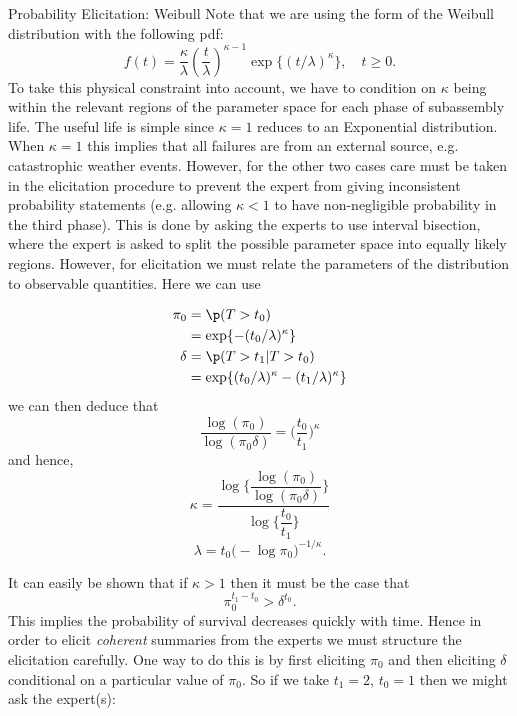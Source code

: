 \begin{chapter}{Probability Elicitation: Weibull \label{Chap:elic-weib}}
Note that we are using the form of the Weibull distribution with the following pdf:
\begin{equation}
	f(t) = \frac{\kappa}{\lambda} \left( \frac{t}{\lambda}\right)^{\kappa - 1} \exp \big\{ (t/ \lambda)^\kappa \big\}, \quad t \geq 0.
\end{equation}
To take this physical constraint into account, we have to condition on $\kappa$ being within the relevant regions of the parameter space for each phase of subassembly life. The useful life is simple since $\kappa = 1$ reduces to an Exponential distribution. When $\kappa =  1$ this implies that all failures are from an external source, e.g. catastrophic weather events. However, for the other two cases care must be taken in the elicitation procedure to prevent the expert from giving inconsistent probability statements (e.g. allowing $\kappa<1$ to have non-negligible probability in the third phase). This is done by asking the experts to use interval bisection, where the expert is asked to split the possible parameter space into equally likely regions. However, for elicitation we must relate the parameters of the distribution to observable quantities. Here we can use

\begin{align*}
	\pi_0 &= \p(T > t_0)\\
		&= \exp \{ -(t_0/ \lambda)^\kappa \}\\
	\delta &= \p(T>t_1 | T > t_0)\\
	& = \exp\{ (t_0/\lambda)^\kappa - (t_1/ \lambda)^\kappa \} 
\end{align*}
we can then deduce that
\begin{equation}
\dfrac{\log(\pi_0)}{\log(\pi_0 \delta)} = \bigg( \dfrac{t_0}{t_1}\bigg) ^\kappa \label{Eq:kappa-exponent}
\end{equation}
and hence, 
\begin{equation}
\kappa =  \dfrac{\log \bigg\{ \dfrac{\log(\pi_0)}{\log(\pi_0 \delta)} \bigg\}}{\log \bigg\{ \dfrac{t_0}{t_1}\bigg\}} \label{Eq:kappa}
\end{equation}
\begin{equation}
\lambda = t_0 \big( - \log \pi_0\big)^{-1/\kappa}. \label{Eq:lambda}
\end{equation}

It can easily be shown that if $\kappa > 1$ then it must be the case that 
\begin{equation}
	\pi_0 ^{t_1 - t_0} > \delta^{t_0}. \label{Eq:pi0-delta}
\end{equation}
This implies the probability of survival decreases quickly with time. Hence in order to elicit \textit{coherent} summaries from the experts we must structure the elicitation carefully. One way to do this is by first eliciting $\pi_0$ and then eliciting $\delta$ conditional on a particular value of $\pi_0$. So if we take $t_1 = 2$, $t_0 = 1$ then we might ask the expert(s):\\\\


\end{chapter}
